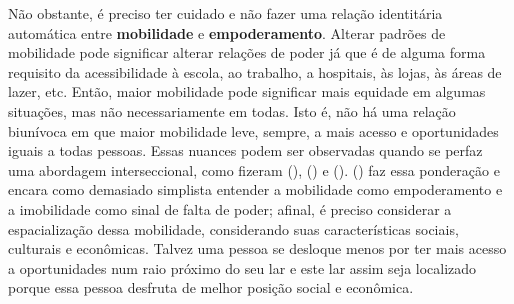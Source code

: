 Não obstante, é preciso ter cuidado e não fazer uma relação identitária automática entre \textbf{mobilidade} e \textbf{empoderamento}.
Alterar padrões de mobilidade pode significar alterar relações de poder já que é de alguma forma requisito da acessibilidade à escola, ao trabalho, a hospitais, às lojas, às áreas de lazer, etc.
Então, maior mobilidade pode significar mais equidade em algumas situações, mas não necessariamente em todas. Isto é, não há uma relação biunívoca em que maior mobilidade leve, sempre, a mais acesso e oportunidades iguais a todas pessoas. Essas nuances podem ser observadas quando se perfaz uma abordagem interseccional, como fizeram  (\citeyear{LAFFERTY1991}),  (\citeyear{LAFFERTY1992}) e  (\citeyear{CRANE2007}).  (\citeyear{GILBERT1998}) faz essa ponderação e encara como demasiado simplista entender a mobilidade como empoderamento e a imobilidade como sinal de falta de poder; afinal, é preciso considerar a espacialização dessa mobilidade, considerando suas características sociais, culturais e econômicas. Talvez uma pessoa se desloque menos por ter mais acesso a oportunidades num raio próximo do seu lar e este lar assim seja localizado porque essa pessoa desfruta de melhor posição social e econômica.





